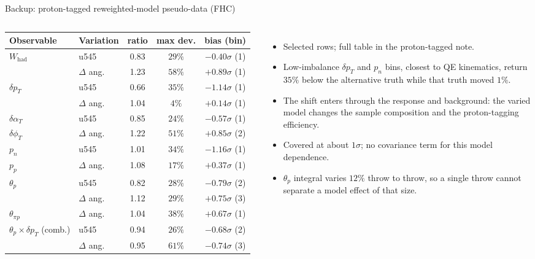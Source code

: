 \documentclass[aspectratio=169,10pt]{beamer}
\begin{document}
\begin{frame}{Backup: proton-tagged reweighted-model pseudo-data (FHC)}
  \begin{columns}[T]
  \scriptsize\centering\setlength{\tabcolsep}{2.5pt}
  \begin{tabular}{llccc}
    \toprule
    Observable & Variation & ratio & max dev. & bias (bin) \\\midrule
    $W_\mathrm{had}$ & u545 & 0.83 & $29\%$ & $-0.40\sigma$ (1) \\
     & $\Delta$ ang. & 1.23 & $58\%$ & $+0.89\sigma$ (1) \\
    $\delta p_T$ & u545 & 0.66 & $35\%$ & $-1.14\sigma$ (1) \\
     & $\Delta$ ang. & 1.04 & $4\%$ & $+0.14\sigma$ (1) \\
    $\delta\alpha_T$ & u545 & 0.85 & $24\%$ & $-0.57\sigma$ (1) \\
    $\delta\phi_T$ & $\Delta$ ang. & 1.22 & $51\%$ & $+0.85\sigma$ (2) \\
    $p_n$ & u545 & 1.01 & $34\%$ & $-1.16\sigma$ (1) \\
    $p_p$ & $\Delta$ ang. & 1.08 & $17\%$ & $+0.37\sigma$ (1) \\\midrule
    $\theta_p$ & u545 & 0.82 & $28\%$ & $-0.79\sigma$ (2) \\
     & $\Delta$ ang. & 1.12 & $29\%$ & $+0.75\sigma$ (3) \\
    $\theta_{\pi p}$ & $\Delta$ ang. & 1.04 & $38\%$ & $+0.67\sigma$ (1) \\
    $\theta_p\times\delta p_T$ (comb.) & u545 & 0.94 & $26\%$ & $-0.68\sigma$ (2) \\
     & $\Delta$ ang. & 0.95 & $61\%$ & $-0.74\sigma$ (3) \\
    \bottomrule
  \end{tabular}
  \scriptsize
  \begin{itemize}\setlength\itemsep{2pt}
    \item Selected rows; full table in the proton-tagged note.
    \item Low-imbalance $\delta p_T$ and $p_n$ bins, closest to QE kinematics, return $35\%$ below the alternative
      truth while that truth moved $1\%$.
    \item The shift enters through the response and background: the varied model changes the sample composition
      and the proton-tagging efficiency.
    \item Covered at about $1\sigma$; no covariance term for this model dependence.
    \item $\theta_p$ integral varies $12\%$ throw to throw, so a single throw cannot separate a model effect of that size.
  \end{itemize}
  \end{columns}
\end{frame}
\end{document}
